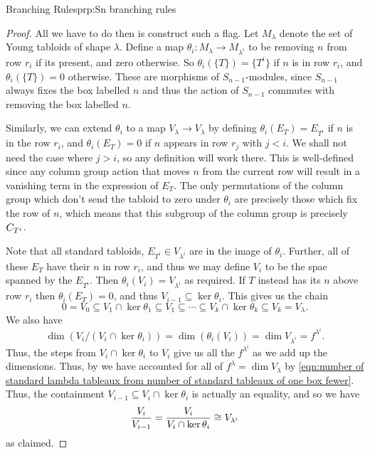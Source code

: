 \begin{prp}{Branching Rules}{prp:Sn branching rules}
\begin{proof}
        All we have to do then is construct such a flag.
        Let \(M_\lambda\) denote the set of Young tabloids of shape \(\lambda\).
        Define a map \(\theta_i \colon M_\lambda \to M_{\lambda^i}\) to be removing \(n\) from row \(r_i\) if its present, and zero otherwise.
        So \(\theta_i(\{T\}) = \{T^i\}\) if \(n\) is in row \(r_i\), and \(\theta_i(\{T\}) = 0\) otherwise.
        These are morphisms of \(S_{n-1}\)-modules, since \(S_{n-1}\) always fixes the box labelled \(n\) and thus the action of \(S_{n-1}\) commutes with removing the box labelled \(n\).
        
        Similarly, we can extend \(\theta_i\) to a map \(V_\lambda \to V_\lambda\) by defining \(\theta_i(E_T) = E_{T^i}\) if \(n\) is in the row \(r_i\), and \(\theta_i(E_T) = 0\) if \(n\) appears in row \(r_j\) with \(j < i\).
        We shall not need the case where \(j > i\), so any definition will work there.
        This is well-defined since any column group action that moves \(n\) from the current row will result in a vanishing term in the expression of \(E_T\).
        The only permutations of the column group which don't send the tabloid to zero under \(\theta_i\) are precisely those which fix the row of \(n\), which means that this subgroup of the column group is precisely \(C_{T^i}\).
        
        Note that all standard tabloids, \(E_{T^i} \in V_{\lambda^i}\) are in the image of \(\theta_i\).
        Further, all of these \(E_T\) have their \(n\) in row \(r_i\), and thus we may define \(V_i\) to be the spae spanned by the \(E_{T^i}\).
        Then \(\theta_i(V_i) = V_{\lambda^i}\) as required.
        If \(T\) instead has its \(n\) above row \(r_i\) then \(\theta_i(E_T) = 0\), and thus \(V_{i-1} \subseteq \ker \theta_i\).
        This gives us the chain
        \begin{equation}
            0 = V_0 \subseteq V_1 \cap \ker \theta_1 \subseteq V_1 \subseteq \dotsb \subseteq V_k \cap \ker \theta_k \subseteq V_k = V_\lambda.
        \end{equation}
        We also have
        \begin{equation}
            \dim(V_i/(V_i \cap \ker \theta_i)) = \dim (\theta_i(V_i)) = \dim V_{\lambda^i} = f^{\lambda^i}.
        \end{equation}
        Thus, the steps from \(V_i \cap \ker \theta_i\) to \(V_i\) give us all the \(f^{\lambda^i}\) as we add up the dimensions.
        Thus, by we have accounted for all of \(f^\lambda = \dim V_\lambda\) by \cref{eqn:number of standard lambda tableaux from number of standard tableaux of one box fewer}.
        Thus, the containment \(V_{i-1} \subseteq V_i \cap \ker \theta_i\) is actually an equality, and so we have
        \begin{equation}
            \frac{V_i}{V_{i-1}} = \frac{V_i}{V_i \cap \ker \theta_i} \cong V_{\lambda^i}
        \end{equation}
        as claimed.
    \end{proof}
\end{prp}


